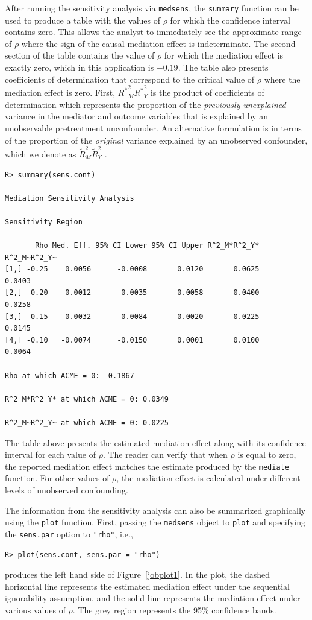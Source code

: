 \documentclass[11pt,letterpaper]{article}
\theoremstyle{plain}
\begin{document}
After running the sensitivity analysis via \texttt{medsens}, the
\texttt{summary} function can be used to produce a table with the
values of $\rho$ for which the confidence interval contains zero.
This allows the analyst to immediately see the approximate range of
$\rho$ where the sign of the causal mediation effect is indeterminate.
The second section of the table contains the value of $\rho$ for which
the mediation effect is exactly zero, which in this application is
$-0.19$. The table also presents coefficients of determination that
correspond to the critical value of $\rho$ where the mediation effect
is zero. First, ${R^\ast}^2_M{R^\ast}^2_Y$ is the product of
coefficients of determination which represents the proportion of the
\emph{previously unexplained} variance in the mediator and outcome
variables that is explained by an unobservable pretreatment
unconfounder.  An alternative formulation is in terms of the
proportion of the \emph{original} variance explained by an unobserved
confounder, which we denote as $\widetilde{R}^2_M\widetilde{R}^2_Y$ .
\begin{verbatim}
R> summary(sens.cont)

Mediation Sensitivity Analysis

Sensitivity Region

       Rho Med. Eff. 95% CI Lower 95% CI Upper R^2_M*R^2_Y* R^2_M~R^2_Y~
[1,] -0.25    0.0056      -0.0008       0.0120       0.0625       0.0403
[2,] -0.20    0.0012      -0.0035       0.0058       0.0400       0.0258
[3,] -0.15   -0.0032      -0.0084       0.0020       0.0225       0.0145
[4,] -0.10   -0.0074      -0.0150       0.0001       0.0100       0.0064

Rho at which ACME = 0: -0.1867

R^2_M*R^2_Y* at which ACME = 0: 0.0349

R^2_M~R^2_Y~ at which ACME = 0: 0.0225

\end{verbatim}
The table above presents the estimated mediation effect along with its
confidence interval for each value of $\rho$.  The reader can verify
that when $\rho$ is equal to zero, the reported mediation effect
matches the estimate produced by the \texttt{mediate} function.  For
other values of $\rho$, the mediation effect is calculated under
different levels of unobserved confounding.

The information from the sensitivity analysis can also be summarized
graphically using the \texttt{plot} function.  First, passing the
\texttt{medsens} object to \texttt{plot} and specifying the
\texttt{sens.par} option to \texttt{"rho"}, i.e.,
\begin{verbatim}
R> plot(sens.cont, sens.par = "rho")
\end{verbatim}
produces the left hand side of Figure~\ref{jobplot1}.  In the plot, the dashed
horizontal line represents the estimated mediation effect under the sequential
ignorability assumption, and the solid line represents the mediation
effect under various values of $\rho$.  The grey region represents the
95\% confidence bands.
\end{document}
